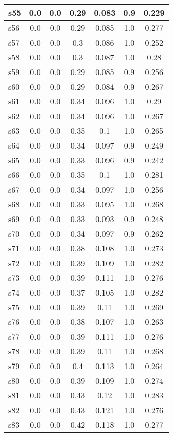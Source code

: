 \documentclass{article}
\begin{document}
\begin{tabular}{|l|c|c|c|c|c|c|}
s55 &0.0 & 0.0 & 0.29 & 0.083 & 0.9 & 0.229\\
\hline
s56 &0.0 & 0.0 & 0.29 & 0.085 & 1.0 & 0.277\\
\hline
s57 &0.0 & 0.0 & 0.3 & 0.086 & 1.0 & 0.252\\
\hline
s58 &0.0 & 0.0 & 0.3 & 0.087 & 1.0 & 0.28\\
\hline
s59 &0.0 & 0.0 & 0.29 & 0.085 & 0.9 & 0.256\\
\hline
s60 &0.0 & 0.0 & 0.29 & 0.084 & 0.9 & 0.267\\
\hline
s61 &0.0 & 0.0 & 0.34 & 0.096 & 1.0 & 0.29\\
\hline
s62 &0.0 & 0.0 & 0.34 & 0.096 & 1.0 & 0.267\\
\hline
s63 &0.0 & 0.0 & 0.35 & 0.1 & 1.0 & 0.265\\
\hline
s64 &0.0 & 0.0 & 0.34 & 0.097 & 0.9 & 0.249\\
\hline
s65 &0.0 & 0.0 & 0.33 & 0.096 & 0.9 & 0.242\\
\hline
s66 &0.0 & 0.0 & 0.35 & 0.1 & 1.0 & 0.281\\
\hline
s67 &0.0 & 0.0 & 0.34 & 0.097 & 1.0 & 0.256\\
\hline
s68 &0.0 & 0.0 & 0.33 & 0.095 & 1.0 & 0.268\\
\hline
s69 &0.0 & 0.0 & 0.33 & 0.093 & 0.9 & 0.248\\
\hline
s70 &0.0 & 0.0 & 0.34 & 0.097 & 0.9 & 0.262\\
\hline
s71 &0.0 & 0.0 & 0.38 & 0.108 & 1.0 & 0.273\\
\hline
s72 &0.0 & 0.0 & 0.39 & 0.109 & 1.0 & 0.282\\
\hline
s73 &0.0 & 0.0 & 0.39 & 0.111 & 1.0 & 0.276\\
\hline
s74 &0.0 & 0.0 & 0.37 & 0.105 & 1.0 & 0.282\\
\hline
s75 &0.0 & 0.0 & 0.39 & 0.11 & 1.0 & 0.269\\
\hline
s76 &0.0 & 0.0 & 0.38 & 0.107 & 1.0 & 0.263\\
\hline
s77 &0.0 & 0.0 & 0.39 & 0.111 & 1.0 & 0.276\\
\hline
s78 &0.0 & 0.0 & 0.39 & 0.11 & 1.0 & 0.268\\
\hline
s79 &0.0 & 0.0 & 0.4 & 0.113 & 1.0 & 0.264\\
\hline
s80 &0.0 & 0.0 & 0.39 & 0.109 & 1.0 & 0.274\\
\hline
s81 &0.0 & 0.0 & 0.43 & 0.12 & 1.0 & 0.283\\
\hline
s82 &0.0 & 0.0 & 0.43 & 0.121 & 1.0 & 0.276\\
\hline
s83 &0.0 & 0.0 & 0.42 & 0.118 & 1.0 & 0.277\\

\end{tabular}
\end{document}
